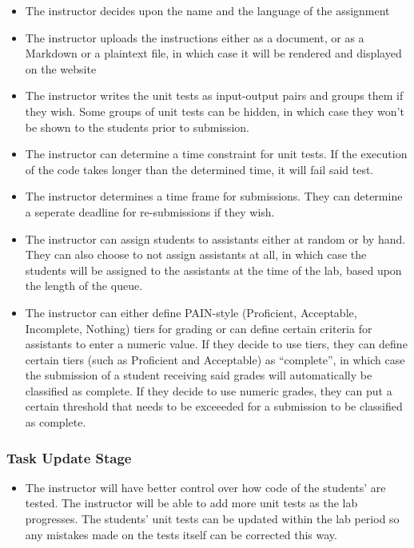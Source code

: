 \documentclass[a4paper, 12pt]{article}
\begin{document}
    \begin{itemize}
        \item The instructor decides upon the name and the language of the assignment
        \item The instructor uploads the instructions either as a document, or as a Markdown
          or a plaintext file, in which case it will be rendered and displayed on the website
        \item The instructor writes the unit tests as input-output pairs and groups them if
          they wish. Some groups of unit tests can be hidden, in which case they won't be
          shown to the students prior to submission.
        \item The instructor can determine a time constraint for unit tests. If the execution
          of the code takes longer than the determined time, it will fail said test.
        \item The instructor determines a time frame for submissions. They can determine a
          seperate deadline for re-submissions if they wish.
        \item The instructor can assign students to assistants either at random or by hand.
          They can also choose to not assign assistants at all, in which case the students
          will be assigned to the assistants at the time of the lab, based upon the length
          of the queue.
        \item The instructor can either define PAIN-style (Proficient, Acceptable, Incomplete, Nothing)
          tiers for grading or can define certain criteria for assistants to enter a numeric value. If they
          decide to use tiers, they can define certain tiers (such as Proficient and Acceptable) as ``complete'',
          in which case the submission of a student receiving said grades will automatically be classified as complete.
          If they decide to use numeric grades, they can put a certain threshold that needs to be exceeeded for a
          submission to be classified as complete.
    \end{itemize}

    \subsubsection{Task Update Stage}

    \begin{itemize}
        \item The instructor will have better control over how code of the students' are tested.
        The instructor will be able to add more unit tests as the lab progresses.
        The students' unit tests can be updated within the lab period so any mistakes made
        on the tests itself can be corrected this way.
    \end{itemize}
\end{document}
